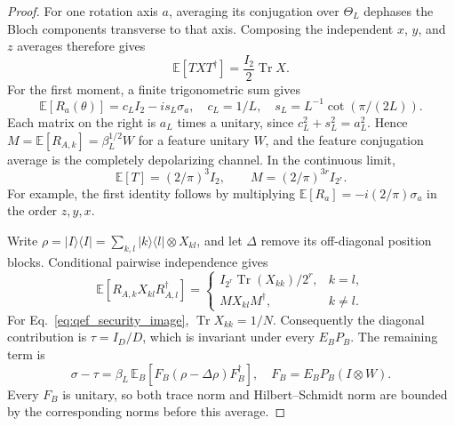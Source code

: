 {\begin{proof}
For one rotation axis $a$, averaging its conjugation over $\Theta_L$
dephases the Bloch components transverse to that axis. Composing the
independent $x$, $y$, and $z$ averages therefore gives
\begin{equation}
 \mathbb E[T X T^{\dagger}]=\frac{I_2}{2}\operatorname{Tr}X.
\end{equation}
For the first moment, a finite trigonometric sum gives
\begin{equation}
 \mathbb E[R_a(\theta)]
 =c_LI_2-is_L\sigma_a,
 \quad c_L=1/L,\quad s_L=L^{-1}\cot(\pi/(2L)).
\end{equation}
Each matrix on the right is $a_L$ times a unitary, since
$c_L^2+s_L^2=a_L^2$. Hence
$M=\mathbb E[R_{A,k}]=\beta_L^{1/2}W$ for a feature unitary $W$,
and the feature conjugation average is the completely depolarizing
channel. In the continuous limit,
\begin{equation}
 \mathbb E[T]=(2/\pi)^3 I_2,
 \qquad M=(2/\pi)^{3r}I_{2^r}.
\end{equation}
For example, the first identity follows by multiplying
$\mathbb E[R_a]=-i(2/\pi)\sigma_a$ in the order $z,y,x$.

Write $\rho=|I\rangle\langle I|=\sum_{k,l}|k\rangle\langle l|\otimes X_{kl}$,
and let $\Delta$ remove its off-diagonal position blocks. Conditional
pairwise independence gives
\begin{equation}
 \mathbb E[R_{A,k}X_{kl}R_{A,l}^{\dagger}]
 =\begin{cases}
 I_{2^r}\operatorname{Tr}(X_{kk})/2^r,&k=l,\\
 MX_{kl}M^{\dagger},&k\ne l.
 \end{cases}
\end{equation}
For Eq.~\eqref{eq:qef_security_image},
$\operatorname{Tr}X_{kk}=1/N$. Consequently the diagonal contribution
is $\tau=I_D/D$, which is invariant under every $E_BP_B$. The remaining
term is
\begin{equation}
 \sigma-\tau=\beta_L\,\mathbb E_B
  [F_B(\rho-\Delta\rho)F_B^{\dagger}],
 \quad F_B=E_BP_B(I\otimes W).
\label{eq:qef_off_diagonal_remainder}
\end{equation}
Every $F_B$ is unitary, so both trace norm and Hilbert--Schmidt norm
are bounded by the corresponding norms before this average.


\end{proof}}
